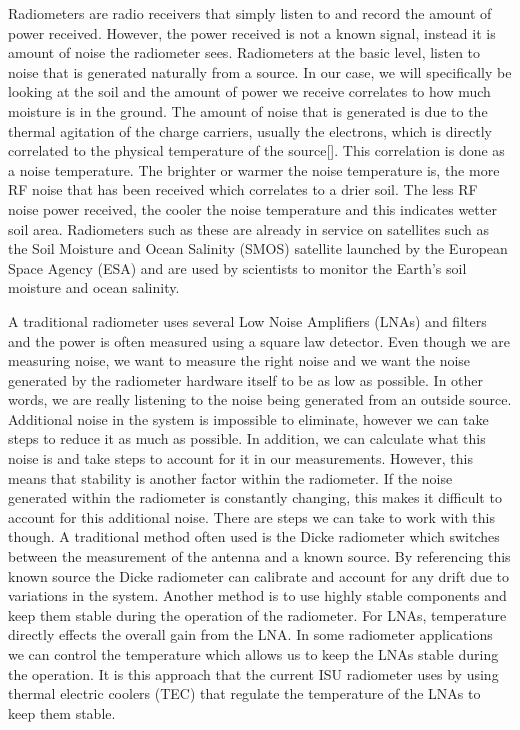 Radiometers are radio receivers that simply listen to and record the amount of power received.  However, the power received is not a known signal, instead it is amount of noise the radiometer sees.  Radiometers at the basic level, listen to noise that is generated naturally from a source.  In our case, we will specifically be looking at the soil and the amount of power we receive correlates to how much moisture is in the ground.  The amount of noise that is generated is due to the thermal agitation of the charge carriers, usually the electrons, which is directly correlated to the physical temperature of the source[\cite{Nyquist1928thermal}].  This correlation is done as a noise temperature.  The brighter or warmer the noise temperature is, the more RF noise that has been received which correlates to a drier soil.  The less RF noise power received, the cooler the noise temperature and this indicates wetter soil area. Radiometers such as these are already in service on satellites such as the Soil Moisture and Ocean Salinity (SMOS) satellite launched by the European Space Agency (ESA) and are used by scientists to monitor the Earth's soil moisture and ocean salinity.  

A traditional radiometer uses several Low Noise Amplifiers (LNAs) and filters and the power is often measured using a square law detector.  Even though we are measuring noise, we want to measure the right noise and we want the noise generated by the radiometer hardware itself to be as low as possible.  In other words, we are really listening to the noise being generated from an outside source.  Additional noise in the system is impossible to eliminate, however we can take steps to reduce it as much as possible.  In addition, we can calculate what this noise is and take steps to account for it in our measurements.  However, this means that stability is another factor within the radiometer.  If the noise generated within the radiometer is constantly changing, this makes it difficult to account for this additional noise.  There are steps we can take to work with this though.  A traditional method often used is the Dicke radiometer which switches between the measurement of the antenna and a known source.  By referencing this known source the Dicke radiometer can calibrate and account for any drift due to variations in the system.  Another method is to use highly stable components and keep them stable during the operation of the radiometer.  For LNAs, temperature directly effects the overall gain from the LNA.  In some radiometer applications we can control the temperature which allows us to keep the LNAs stable during the operation.  It is this approach that the current ISU radiometer uses by using thermal electric coolers (TEC) that  regulate the temperature of the LNAs to keep them stable.


